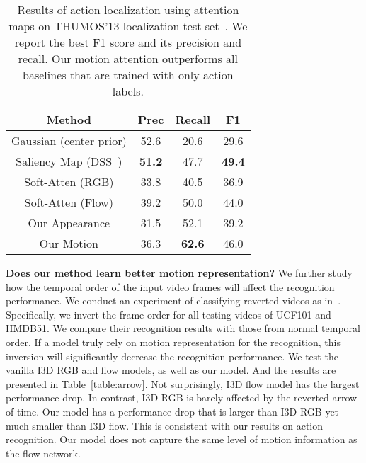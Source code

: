\documentclass{bmvc2k}
\newcommand{\tablestyle}[2]{\setlength{\tabcolsep}{#1}\renewcommand{\arraystretch}{#2}\centering\footnotesize}
\begin{document}
\begin{table}
\centering
\tablestyle{2pt}{1.5}
\setlength{\tabcolsep}{12pt} \renewcommand{\arraystretch}{1} \footnotesize
\begin{tabular}{c|ccc}
Method                                  & Prec        & Recall   & F1    \\ \hline 
Gaussian (center prior)                 & 52.6        & 20.6     & 29.6  \\ 
Saliency Map (DSS~\cite{hou2017deeply}) & \textbf{51.2} & 47.7     & \textbf{49.4}  \\ 
Soft-Atten (RGB)                        & 33.8        & 40.5     & 36.9  \\ 
Soft-Atten (Flow)                       & 39.2        & 50.0     & 44.0  \\ 
Our Appearance                          & 31.5        & 52.1     & 39.2  \\ 
Our Motion                              & 36.3        & \textbf{62.6}     & 46.0  \\ 
\end{tabular}
\caption{Results of action localization using attention maps on THUMOS'13 localization test set~\cite{idrees2017thumos}. We report the best F1 score and its precision and recall. Our motion attention outperforms all baselines that are trained with only action labels.\vspace{-0.6em}}
\label{table:Localization}
\end{table}

\noindent \textbf{Does our method learn better motion representation?} We further study how the temporal order of the input video frames will affect the recognition performance. We conduct an experiment of classifying reverted videos as in~\cite{Xie_2018_ECCV,zhou2017temporal}. Specifically, we invert the frame order for all testing videos of UCF101 and HMDB51. We compare their recognition results with those from normal temporal order. If a model truly rely on motion representation for the recognition, this inversion will significantly decrease the recognition performance. We test the vanilla I3D RGB and flow models, as well as our model. And the results are presented in Table~\ref{table:arrow}. Not surprisingly, I3D flow model has the largest performance drop. In contrast, I3D RGB is barely affected by the reverted arrow of time. Our model has a performance drop that is larger than I3D RGB yet much smaller than I3D flow. This is consistent with our results on action recognition. Our model does not capture the same level of motion information as the flow network.\\ 
\end{document}
